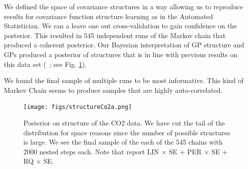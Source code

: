 \documentclass{article} %
\begin{document}
We defined the space of covariance structures in a way allowing us to reproduce results for covariance function structure learning as in the Automated Statistician. We ran a leave one out cross-validation to gain confidence on the posterior. This resulted in 545 independent runs of the Markov chain that produced a coherent posterior. Our Bayesian interpretation of GP structure and GPs produced a posterior of structures that is in line with previous results on this data set (~\citealp*{duvenaud2013structure}; see Fig. \ref{fig:structureCo2}).

We found the final sample of multiple runs to be most informative. This kind of Markov Chain seems to produce samples that are highly auto-correlated.

\begin{figure}[p]

\centering
    \texttt{[image: figs/structureCo2a.png]}
    \caption{Posterior on structure of the CO2 data. We have cut the tail of the distribution for space reasons since the number of possible structures is large. We see the final sample of the each of the 545 chains with 2000 nested steps each. Note that \citet{duvenaud2013structure} report LIN $\times$ SE $+$ PER $\times$ SE $+$ RQ $\times$ SE.}\label{fig:structureCo2}
\end{figure}
\end{document}
